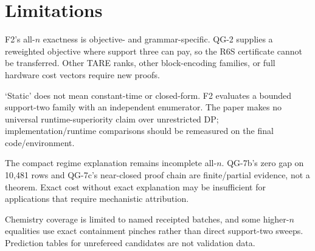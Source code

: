 \section{Limitations}

F2's all-$n$ exactness is objective- and grammar-specific. QG-2 supplies a reweighted objective where support three can pay, so the R6S certificate cannot be transferred. Other TARE ranks, other block-encoding families, or full hardware cost vectors require new proofs.

`Static' does not mean constant-time or closed-form. F2 evaluates a bounded support-two family with an independent enumerator. The paper makes no universal runtime-superiority claim over unrestricted DP; implementation/runtime comparisons should be remeasured on the final code/environment.

The compact regime explanation remains incomplete all-$n$. QG-7b's zero gap on 10,481 rows and QG-7c's near-closed proof chain are finite/partial evidence, not a theorem. Exact cost without exact explanation may be insufficient for applications that require mechanistic attribution.

Chemistry coverage is limited to named receipted batches, and some higher-$n$ equalities use exact containment pinches rather than direct support-two sweeps. Prediction tables for unrefereed candidates are not validation data.